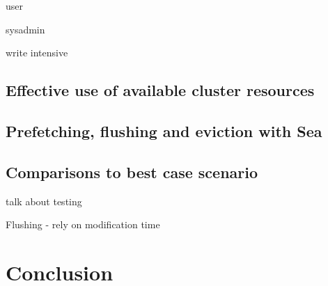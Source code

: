     user
    
    sysadmin
    
    write intensive
    
    
    
    \subsection{Effective use of available cluster resources}
    \subsection{Prefetching, flushing and eviction with Sea}
    \subsection{Comparisons to best case scenario}
    
    talk about testing
    
    
    Flushing - rely on modification time
    \section{Conclusion}